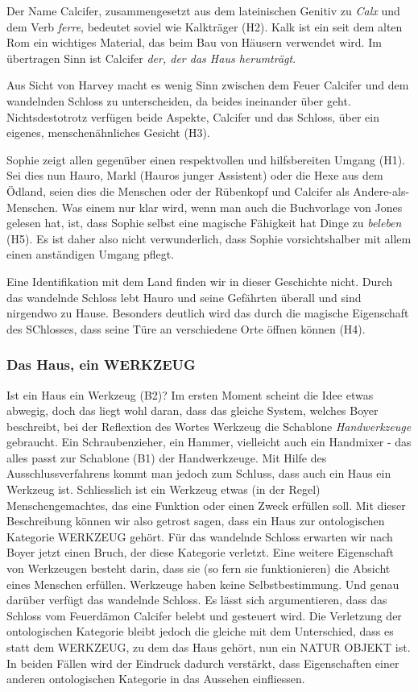 Der Name Calcifer, zusammengesetzt aus dem lateinischen Genitiv zu \emph{Calx} und dem Verb \emph{ferre}, bedeutet soviel wie Kalkträger (H2). Kalk ist ein seit dem alten Rom ein wichtiges Material, das beim Bau von Häusern verwendet wird. Im übertragen Sinn ist Calcifer \emph{der, der das Haus herumträgt}.

Aus Sicht von Harvey macht es wenig Sinn zwischen dem Feuer Calcifer und dem wandelnden Schloss zu unterscheiden, da beides ineinander über geht. Nichtsdestotrotz verfügen beide Aspekte, Calcifer und 
das Schloss, über ein eigenes, menschenähnliches Gesicht (H3).

Sophie zeigt allen gegenüber einen respektvollen und hilfsbereiten Umgang (H1). Sei dies nun Hauro, Markl (Hauros junger Assistent) oder die Hexe aus dem Ödland, seien dies die Menschen oder der Rübenkopf und Calcifer als Andere-als-Menschen. Was einem nur klar wird, wenn man auch die Buchvorlage von Jones gelesen hat, ist, dass Sophie selbst eine magische Fähigkeit hat Dinge zu \emph{beleben} (H5). Es ist daher also nicht verwunderlich, dass Sophie vorsichtshalber mit allem einen anständigen Umgang pflegt.

Eine Identifikation mit dem Land finden wir in dieser Geschichte nicht. Durch das wandelnde Schloss lebt Hauro und seine Gefährten überall und sind nirgendwo zu Hause. Besonders deutlich wird das durch die magische Eigenschaft des SChlosses, dass seine Türe an verschiedene Orte öffnen können (H4).

\subsubsection{Das Haus, ein WERKZEUG} 
Ist ein Haus ein Werkzeug (B2)? Im ersten Moment scheint die Idee etwas abwegig, doch das liegt wohl daran, dass das gleiche System, welches Boyer beschreibt, bei der Reflextion des Wortes Werkzeug die Schablone \emph{Handwerkzeuge} gebraucht. Ein Schraubenzieher, ein Hammer, vielleicht auch ein Handmixer - das alles passt zur Schablone (B1) der Handwerkzeuge. Mit Hilfe des Ausschlussverfahrens kommt man jedoch zum Schluss, dass auch ein Haus ein Werkzeug ist. Schliesslich ist ein Werkzeug etwas (in der Regel) Menschengemachtes, das eine Funktion oder einen Zweck erfüllen soll. Mit dieser Beschreibung können wir also getrost sagen, dass ein Haus zur ontologischen Kategorie WERKZEUG gehört. Für das wandelnde Schloss erwarten wir nach Boyer jetzt einen Bruch, der diese Kategorie verletzt. Eine weitere Eigenschaft von Werkzeugen besteht darin, dass sie (so fern sie funktionieren) die Absicht eines Menschen erfüllen. Werkzeuge haben keine Selbstbestimmung. Und genau darüber verfügt das wandelnde Schloss. Es lässt sich argumentieren, dass das Schloss vom Feuerdämon Calcifer belebt und gesteuert wird. Die Verletzung der ontologischen Kategorie bleibt jedoch die gleiche mit dem Unterschied, dass es statt dem WERKZEUG, zu dem das Haus gehört, nun ein NATUR OBJEKT ist. In beiden Fällen wird der Eindruck dadurch verstärkt, dass Eigenschaften einer anderen ontologischen Kategorie in das Aussehen einfliessen. 

